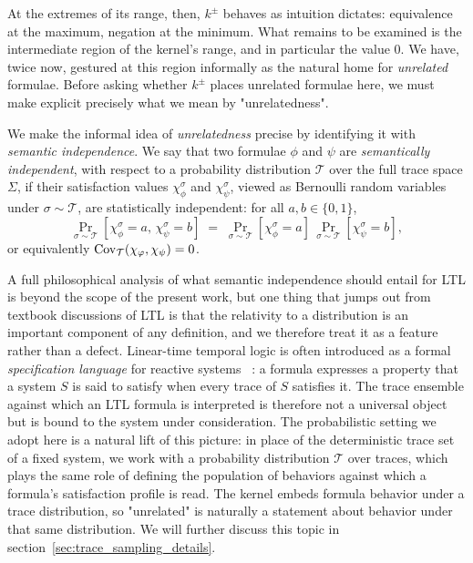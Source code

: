 \documentclass[titlepage,a4paper,11pt]{report}
\begin{document}
    At the extremes of its range, then, $k^\pm$ behaves as intuition dictates: equivalence at the maximum, negation at the minimum. What remains to be examined is the intermediate region of the kernel's range, and in particular the value $0$. We have, twice now, gestured at this region informally as the natural home for \emph{unrelated} formulae. Before asking whether $k^\pm$ places unrelated formulae here, we must make explicit precisely what we mean by "unrelatedness".
    
    We make the informal idea of \emph{unrelatedness} precise by identifying it with \emph{semantic independence}. We say that two formulae $\phi$ and $\psi$ are \emph{semantically independent}, with respect to a probability distribution $\mathcal{T}$ over the full trace space $\Sigma$, if their satisfaction values $\chi^\sigma_\phi$ and $\chi^\sigma_\psi$, viewed as Bernoulli random variables under $\sigma \sim \mathcal{T}$, are statistically independent: for all $a, b \in \{0, 1\}$,
    \begin{equation}
        \Pr_{\sigma \sim \mathcal{T}}[\chi^\sigma_\phi = a,\, \chi^\sigma_\psi = b]
        \;=\;
        \Pr_{\sigma \sim \mathcal{T}}[\chi^\sigma_\phi = a]\,
        \Pr_{\sigma \sim \mathcal{T}}[\chi^\sigma_\psi = b],
    \end{equation}
    or equivalently $\mathrm{Cov}_{\mathcal{T}}(\chi_\varphi, \chi_\psi) = 0$.
    
    A full philosophical analysis of what semantic independence should entail for LTL is beyond the scope of the present work, but one thing that jumps out from textbook discussions of LTL is that the relativity to a distribution is an important component of any definition, and we therefore treat it as a feature rather than a defect. Linear-time temporal logic is often introduced as a formal \emph{specification language} for reactive systems ~\citep{baier_principles_2008}: a formula expresses a property that a system $S$ is said to satisfy when every trace of $S$ satisfies it. The trace ensemble against which an LTL formula is interpreted is therefore not a universal object but is bound to the system under consideration. The probabilistic setting we adopt here is a natural lift of this picture: in place of the deterministic trace set of a fixed system, we work with a probability distribution $\mathcal{T}$ over traces, which plays the same role of defining the population of behaviors against which a formula's satisfaction profile is read. The kernel embeds formula behavior under a trace distribution, so "unrelated" is naturally a statement about behavior under that same distribution. We will further discuss this topic in section~\ref{sec:trace_sampling_details}. 
    
\end{document}
